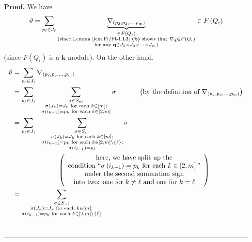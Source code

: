 \documentclass[numbers=enddot,12pt,final,onecolumn,notitlepage]{scrartcl}%
\theoremstyle{definition}
\newenvironment{proof}[1][Proof]{\noindent\textbf{#1.} }{\ \rule{0.5em}{0.5em}}
\let\sumnonlimits\sum
\renewcommand{\sum}{\sumnonlimits\limits}
\begin{document}
\begin{proof}
We have%
\[
\vartheta=\sum_{p_{\ell}\in J_{\ell}}\underbrace{\nabla_{\left(  p_{2}%
,p_{3},\ldots,p_{m}\right)  }}_{\substack{\in F\left(  Q_{i}\right)
\\\text{(since Lemma \ref{lem.Fi/Fi-1.L3} \textbf{(b)} shows that }%
\nabla_{\mathbf{q}}\in F\left(  Q_{i}\right)  \\\text{for any }\mathbf{q}\in
J_{2}\times J_{3}\times\cdots\times J_{m}\text{)}}}\in F\left(  Q_{i}\right)
\]
(since $F\left(  Q_{i}\right)  $ is a $\mathbf{k}$-module). On the other hand,%
\begin{align}
\vartheta &  =\sum_{p_{\ell}\in J_{\ell}}\nabla_{\left(  p_{2},p_{3}%
,\ldots,p_{m}\right)  }\nonumber\\
&  =\sum_{p_{\ell}\in J_{\ell}}\ \ \sum_{\substack{\sigma\in S_{n}%
;\\\sigma\left(  J_{k}\right)  =J_{k}\text{ for each }k\in\left[  m\right]
;\\\sigma\left(  i_{k-1}\right)  =p_{k}\text{ for each }k\in\left[
2,m\right]  }}\sigma\ \ \ \ \ \ \ \ \ \ \left(  \text{by the definition of
}\nabla_{\left(  p_{2},p_{3},\ldots,p_{m}\right)  }\right)  \nonumber\\
&  =\sum_{p_{\ell}\in J_{\ell}}\ \ \sum_{\substack{\sigma\in S_{n}%
;\\\sigma\left(  J_{k}\right)  =J_{k}\text{ for each }k\in\left[  m\right]
;\\\sigma\left(  i_{k-1}\right)  =p_{k}\text{ for each }k\in\left[
2,m\right]  \setminus\left\{  \ell\right\}  ;\\\sigma\left(  i_{\ell
-1}\right)  =p_{\ell}}}\sigma\nonumber\\
&  \ \ \ \ \ \ \ \ \ \ \ \ \ \ \ \ \ \ \ \ \left(
\begin{array}
[c]{c}%
\text{here, we have split up the}\\
\text{condition \textquotedblleft}\sigma\left(  i_{k-1}\right)  =p_{k}\text{
for each }k\in\left[  2,m\right]  \text{\textquotedblright}\\
\text{under the second summation sign}\\
\text{into two: one for }k\neq\ell\text{ and one for }k=\ell
\end{array}
\right)  \nonumber\\
&  =\sum_{\substack{\sigma\in S_{n};\\\sigma\left(  J_{k}\right)  =J_{k}\text{
for each }k\in\left[  m\right]  ;\\\sigma\left(  i_{k-1}\right)  =p_{k}\text{
for each }k\in\left[  2,m\right]  \setminus\left\{  \ell\right\}
}}
\end{align}
\end{proof}
\end{document}
